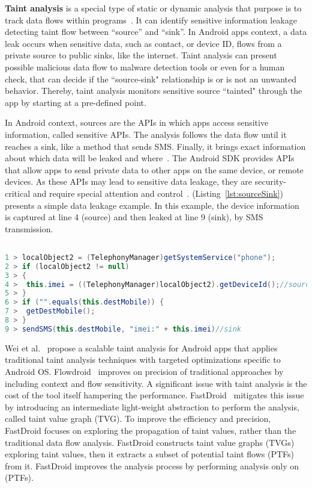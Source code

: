 \textbf{Taint analysis} is a special type of static or dynamic analysis that purpose is to track data flows within programs~\cite{DBLP:conf/sigsoft/PauckBW18}. It can identify sensitive information leakage detecting taint flow between ``source'' and ``sink''. In Android apps context, a data leak occurs when sensitive data, such as contact, or device ID, flows from a private source to public sinks, like the internet. Taint analysis can present possible malicious data flow to malware detection tools or even for a human check, that can decide if the ``source-sink" relationship is or is not an unwanted behavior. Thereby, taint analysis monitors sensitive source ``tainted" through the app by starting at a pre-defined point. 

In Android context, sources are the APIs in which apps access sensitive information, called sensitive APIs. The analysis follows the data flow until it reaches a sink, like a method that sends SMS. Finally, it brings exact information about which data will be leaked and where~\cite{DBLP:conf/pldi/ArztRFBBKTOM14}. The Android SDK provides APIs that allow apps to send private data to other apps on the same device, or remote devices. As these APIs may lead to sensitive data leakage, they are security-critical and require special attention and control~\cite{DBLP:conf/osdi/EnckGCCJMS10}. (Listing~\ref{lst:sourceSink}) presents a simple data leakage example. In this example, the device information is captured at line 4 (source) and then leaked at line 9 (sink), by SMS transmission.


\begin{lstlisting}[caption={Simple Data Leakage},
      language=Java, basicstyle=\fontsize{8}{6}\selectfont\ttfamily,
      label={lst:sourceSink}]

1 > localObject2 = (TelephonyManager)getSystemService("phone");
2 > if (localObject2 != null)
3 > {
4 >  this.imei = ((TelephonyManager)localObject2).getDeviceId();//source
5 > }
6 > if ("".equals(this.destMobile)) {
7 >  getDestMobile();
8 > }
9 > sendSMS(this.destMobile, "imei:" + this.imei)//sink
\end{lstlisting}


Wei et al.~\cite{DBLP:conf/issta/HuangDMD15} propose a scalable taint analysis for Android apps that applies traditional taint analysis techniques with targeted optimizations specific to Android OS. Flowdroid~\cite{DBLP:conf/pldi/ArztRFBBKTOM14} improves on precision of traditional approaches by including context and flow sensitivity. A significant issue with taint analysis is the cost of the tool itself hampering the performance. FastDroid~\cite{DBLP:journals/compsec/ZhangTD21} mitigates this issue by introducing an intermediate light-weight abstraction to perform the analysis, called taint value graph (TVG). To improve the efficiency and precision, FastDroid focuses on exploring the propagation of taint values, rather than the traditional data flow analysis. FastDroid constructs taint value graphs (TVGs) exploring taint values, then it extracts a subset of potential taint flows (PTFs) from it. FastDroid improves the analysis process by performing analysis only on (PTFs).
